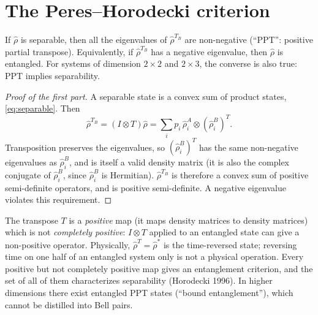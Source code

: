 \section{The Peres--Horodecki criterion}
\begin{theorem}
If $\hat\rho$ is separable, then all the eigenvalues of $\hat\rho^{T_B}$ are non-negative (``PPT'': positive partial transpose). Equivalently, if $\hat\rho^{T_B}$ has a negative
eigenvalue, then $\hat\rho$ is entangled. For systems of dimension $2\times2$ and $2\times3$, the converse is also true: PPT implies separability.
\end{theorem}
\begin{proof}[Proof of the first part]
A separable state is a convex sum of product states, \cref{eq:separable}. Then
\begin{equation}
  \hat\rho^{T_B}=(I\otimes T)\hat\rho=\sum_ip_i\,\hat\rho_i^A\otimes\left(\hat\rho_i^B\right)^T.
\end{equation}
Transposition preserves the eigenvalues, so $(\hat\rho_i^B)^T$ has the same non-negative eigenvalues as $\hat\rho_i^B$, and is itself a valid density matrix (it is
also the complex conjugate of $\hat\rho_i^B$, since $\hat\rho_i^B$ is Hermitian). $\hat\rho^{T_B}$ is therefore a convex sum of positive semi-definite operators, and is positive
semi-definite. A negative eigenvalue violates this requirement.
\end{proof}
\begin{remark}
The transpose $T$ is a \emph{positive} map (it maps density matrices to density matrices) which is not \emph{completely positive}: $I\otimes T$ applied to an entangled
state can give a non-positive operator. Physically, $\hat\rho^T=\hat\rho^*$ is the time-reversed state; reversing time on one half of an entangled system only is not a
physical operation. Every positive but not completely positive map gives an entanglement criterion, and the set of all of them characterizes separability (Horodecki 1996).
In higher dimensions there exist entangled PPT states (``bound entanglement''), which cannot be distilled into Bell pairs.
\end{remark}

